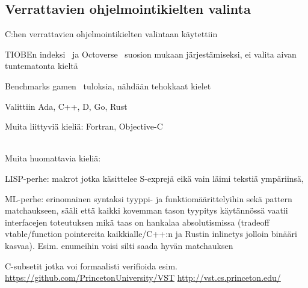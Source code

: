 \subsection{Verrattavien ohjelmointikielten valinta}

C:hen verrattavien ohjelmointikielten valintaan käytettiin

TIOBEn indeksi~\citep{tiobe} ja Octoverse~\citep{octoverse} suosion
mukaan järjestämiseksi, ei valita aivan tuntematonta kieltä

Benchmarks gamen~\citep{benchmarks} tuloksia, nähdään tehokkaat kielet

Valittiin Ada, C++, D, Go, Rust

Muita liittyviä kieliä: Fortran, Objective-C \\
 \\



Muita huomattavia kieliä:

LISP-perhe: makrot jotka käsittelee S-exprejä eikä
vain läimi tekstiä ympäriinsä,

ML-perhe: erinomainen syntaksi tyyppi- ja funktiomäärittelyihin sekä pattern
matchaukseen, sääli että kaikki kovemman tason tyypitys käytännössä vaatii
interfacejen toteutuksen mikä taas on hankalaa absolutismissa (tradeoff
vtable/function pointereita kaikkialle/C++:n ja Rustin inlinetys jolloin
binääri kasvaa).  Esim. enumeihin voisi silti saada hyvän matchauksen

C-subsetit jotka voi formaalisti verifioida esim. 
\url{https://github.com/PrincetonUniversity/VST}
\url{http://vst.cs.princeton.edu/}
